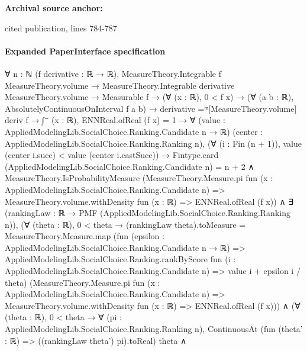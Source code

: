 \documentclass[10pt]{article}
\begin{document}
\textbf{Archival source anchor:} {\footnotesize\raggedright cited publication, lines 784-\allowbreak{}787\par}
\paragraph{Expanded PaperInterface specification}
\begin{ReviewVerbatim}
∀ {n : ℕ} (f derivative : ℝ → ℝ),
  MeasureTheory.Integrable f MeasureTheory.volume →
    MeasureTheory.Integrable derivative MeasureTheory.volume →
      Measurable f →
        (∀ (x : ℝ), 0 < f x) →
          (∀ (a b : ℝ), AbsolutelyContinuousOnInterval f a b) →
            derivative =ᵐ[MeasureTheory.volume] deriv f →
              ∫⁻ (x : ℝ), ENNReal.ofReal (f x) = 1 →
                ∀ (value : AppliedModelingLib.SocialChoice.Ranking.Candidate n → ℝ)
                  (center : AppliedModelingLib.SocialChoice.Ranking.Ranking n),
                  (∀ (i : Fin (n + 1)), value (center i.succ) < value (center i.castSucc)) →
                    Fintype.card (AppliedModelingLib.SocialChoice.Ranking.Candidate n) = n + 2 ∧
                      MeasureTheory.IsProbabilityMeasure
                          (MeasureTheory.Measure.pi fun (x : AppliedModelingLib.SocialChoice.Ranking.Candidate n) =>
                            MeasureTheory.volume.withDensity fun (x : ℝ) => ENNReal.ofReal (f x)) ∧
                        ∃ (rankingLaw : ℝ → PMF (AppliedModelingLib.SocialChoice.Ranking.Ranking n)),
                          (∀ (theta : ℝ),
                              0 < theta →
                                (rankingLaw theta).toMeasure =
                                  MeasureTheory.Measure.map
                                    (fun (epsilon : AppliedModelingLib.SocialChoice.Ranking.Candidate n → ℝ) =>
                                      AppliedModelingLib.SocialChoice.Ranking.rankByScore
                                        fun (i : AppliedModelingLib.SocialChoice.Ranking.Candidate n) =>
                                        value i + epsilon i / theta)
                                    (MeasureTheory.Measure.pi
                                      fun (x : AppliedModelingLib.SocialChoice.Ranking.Candidate n) =>
                                      MeasureTheory.volume.withDensity fun (x : ℝ) => ENNReal.ofReal (f x))) ∧
                            (∀ (theta : ℝ),
                                0 < theta →
                                  ∀ (pi : AppliedModelingLib.SocialChoice.Ranking.Ranking n),
                                    ContinuousAt (fun (theta' : ℝ) => ((rankingLaw theta') pi).toReal) theta ∧

\end{ReviewVerbatim}
\end{document}
